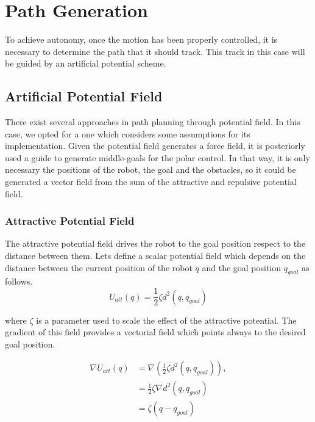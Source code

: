 \documentclass[conference]{IEEEtran}
\begin{document}
\section{Path Generation}
\label{sec:APF}

To achieve autonomy, once the motion has been properly controlled, it is necessary to determine the path that it should track. This track in this case will be guided by an artificial potential scheme.

\subsection{Artificial Potential Field}
There exist several approaches in path planning through potential field. In this case, we opted for a one which considers some assumptions for its implementation. Given the potential field generates a force field, it is posteriorly used a guide to generate middle-goals for the polar control. In that way, it is only necessary the positions of the robot, the goal and the obstacles, so it could be generated a vector field from the sum of the attractive  and repulsive potential field.\\

\subsubsection{\textbf{Attractive Potential Field}}
The attractive potential field drives the robot to the goal position respect to the distance between them. Lets define a scalar potential field which depends on the distance between the current position of the robot $q$ and the goal position $q_{goal}$ as follows. 
\begin{equation}
	U_{att}(q) = \frac{1}{2} \zeta d^2(q,q_{goal})
	\label{eq:pot_attr}
\end{equation}

where  $\zeta$  is a parameter used to scale the effect of the attractive potential. The gradient of this field provides a vectorial field which points always to the desired goal position.

\begin{equation}
	\label{gradient_att}
	\begin{aligned}
		\nabla U_{att}(q) &= \nabla (\frac{1}{2}\zeta d^2 (q,q_{goal})),\\
		&=\frac{1}{2}\zeta \nabla d^2(q,q_{goal})\\
		&= \zeta(q - q_{goal})
	\end{aligned}
\end{equation}
\end{document}
